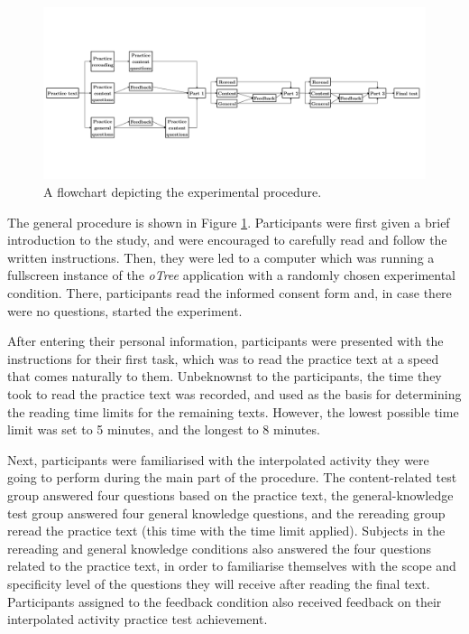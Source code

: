 \documentclass[../main.tex]{subfiles}
\begin{document}
\begin{figure}[p]
  \centering
  \includegraphics[width = 1.3\textwidth, keepaspectratio, angle = 90, trim = 0 0 0 0]{images/procedure.pdf}
  \caption{A flowchart depicting the experimental procedure.}
  \label{flowchart}
\end{figure}

The general procedure is shown in Figure \ref{flowchart}. Participants
were first given a brief introduction to the study, and were encouraged
to carefully read and follow the written instructions. Then, they were
led to a computer which was running a fullscreen instance of the
\textit{oTree} application with a randomly chosen experimental
condition. There, participants read the informed consent form and, in
case there were no questions, started the experiment.

After entering their personal information, participants were presented
with the instructions for their first task, which was to read the
practice text at a speed that comes naturally to them. Unbeknownst to
the participants, the time they took to read the practice text was
recorded, and used as the basis for determining the reading time limits
for the remaining texts. However, the lowest possible time limit was set
to 5 minutes, and the longest to 8 minutes.

Next, participants were familiarised with the interpolated activity they
were going to perform during the main part of the procedure. The
content-related test group answered four questions based on the practice
text, the general-knowledge test group answered four general knowledge
questions, and the rereading group reread the practice text (this time
with the time limit applied). Subjects in the rereading and general
knowledge conditions also answered the four questions related to the
practice text, in order to familiarise themselves with the scope and
specificity level of the questions they will receive after reading the
final text. Participants assigned to the feedback condition also
received feedback on their interpolated activity practice test
achievement.
\end{document}
